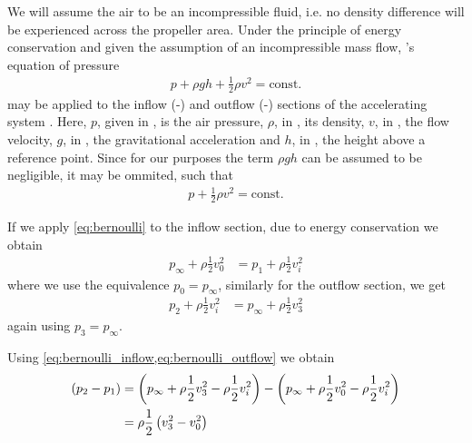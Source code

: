 We will assume the air to be an incompressible fluid, i.e. no density difference will be experienced across the propeller area. 
Under the principle of energy conservation and given the assumption of an incompressible mass flow, 's equation of pressure
%
\begin{align}
p + \rho g h + \frac{1}{2}\rho v^2 = \text{const.}
\end{align}
%
may be applied to the inflow (-) and outflow (-) sections of the accelerating system \cite{seddon2002}.
Here, $p$, given in \withunit{\newton\per\square\metre}, is the air pressure, 
$\rho$, in \withunit{\kilo\gram\per\cubic\metre}, its density,
$v$, in \withunit{\metre\per\second}, the flow velocity,
$g$, in , the gravitational acceleration and
$h$, in \withunit{\metre}, the height above a reference point.
%
%
Since for our purposes the term $\rho g h$ can be assumed to be negligible, it may be ommited, such that
%
\begin{align}
p + \frac{1}{2}\rho v^2 = \text{const.} \label{eq:bernoulli}
\end{align}

If we apply \cref{eq:bernoulli} to the inflow section, due to energy conservation we obtain
%
\begin{align}
p_\infty + \rho \frac{1}{2} v^2_0 &= p_1 + \rho \frac{1}{2} v^2_i \label{eq:bernoulli_inflow}
\end{align}
%
where we use the equivalence $p_0 = p_\infty$, similarly for the outflow section, we get
%
\begin{align}
p_2 + \rho \frac{1}{2} v^2_i &= p_\infty + \rho \frac{1}{2} v^2_3 \label{eq:bernoulli_outflow}
\end{align}
%
again using $p_3 = p_\infty$.

Using \cref{eq:bernoulli_inflow,eq:bernoulli_outflow} we obtain
%
\begin{align}
\left( p_2 - p_1 \right) &= \left(p_\infty + \rho \frac{1}{2} v^2_3 - \rho \frac{1}{2} v^2_i\right) - \left( p_\infty + \rho \frac{1}{2} v^2_0 - \rho \frac{1}{2} v^2_i\right) \\
                     &= \rho \frac{1}{2} \left( v^2_3 - v^2_0 \right)
\end{align}


